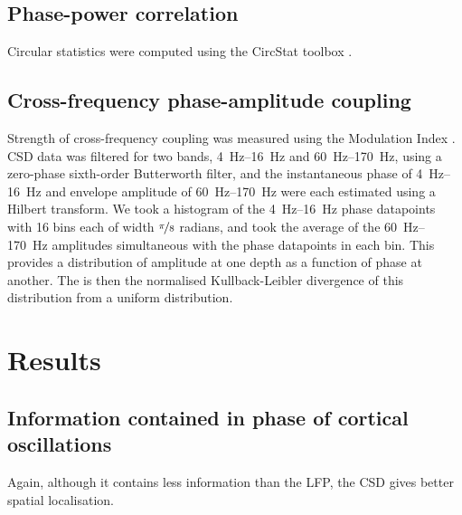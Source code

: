 \subsection{Phase-power correlation}

Circular statistics were computed using the CircStat toolbox \citep{Berens2009}.


\subsection{Cross-frequency phase-amplitude coupling}

Strength of cross-frequency coupling was measured using the Modulation Index \citep{Tort2010}.
\ac{CSD} data was filtered for two bands, \SIrange{4}{16}{Hz} and \SIrange{60}{170}{Hz}, using a zero-phase sixth-order Butterworth filter, and the instantaneous phase of \SIrange{4}{16}{Hz} and envelope amplitude of \SIrange{60}{170}{Hz} were each estimated using a Hilbert transform.
We took a histogram of the \SIrange{4}{16}{Hz} phase datapoints with \num{16} bins each of width $\nicefrac{\pi}{8}$ radians, and took the average of the \SIrange{60}{170}{Hz} amplitudes simultaneous with the phase datapoints in each bin.
This provides a distribution of amplitude at one depth as a function of phase at another.
The  is then the normalised Kullback-Leibler divergence of this distribution from a uniform distribution.


\section{Results}


\FloatBarrier
\subsection{Information contained in phase of cortical oscillations}

Again, although it contains less information than the \ac{LFP}, the \ac{CSD} gives better spatial localisation.

